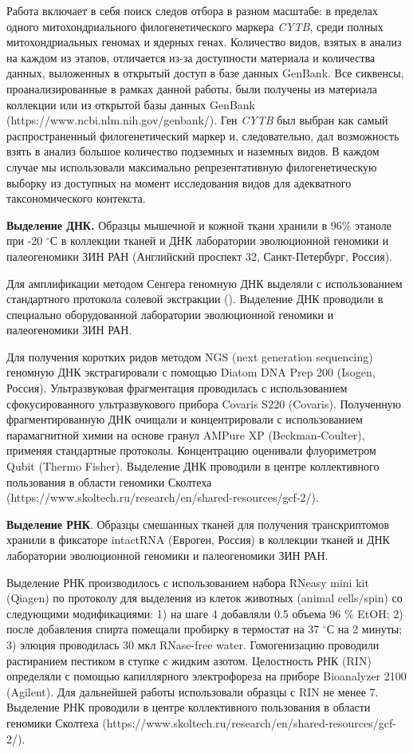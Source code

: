 Работа включает в себя поиск следов отбора в разном масштабе: в пределах одного митохондриального филогенетического маркера \textit{CYTB}, среди полных митохондриальных геномах и ядерных генах. Количество видов, взятых в анализ на каждом из этапов, отличается из-за доступности материала и количества данных, выложенных в открытый доступ в базе данных GenBank. Все сиквенсы, проанализированные в рамках данной работы, были получены из материала коллекции или из открытой базы данных GenBank (https://www.ncbi.nlm.nih.gov/genbank/). Ген \textit{CYTB} был выбран как самый распространенный филогенетический маркер и, следовательно, дал возможность взять в анализ большое количество подземных и наземных видов. В каждом случае мы использовали максимально репрезентативную филогенетическую выборку из доступных на момент исследования видов для адекватного таксономического контекста.

\textbf{Выделение ДНК.} Образцы мышечной и кожной ткани хранили в 96\% этаноле при -20 $^\circ$С в коллекции тканей и ДНК лаборатории эволюционной геномики и палеогеномики ЗИН РАН (Английский проспект 32, Санкт-Петербург, Россия).  

Для амплификации методом Сенгера геномную ДНК выделяли с использованием стандартного протокола солевой экстракции (\cite{Miller1999}). Выделение ДНК проводили в специально оборудованной лаборатории эволюционной геномики и палеогеномики ЗИН РАН.

Для получения коротких ридов методом NGS (next generation sequencing) геномную ДНК экстрагировали с помощью Diatom DNA Prep 200 (Isogen, Россия). Ультразвуковая фрагментация проводилась с использованием сфокусированного ультразвукового прибора Covaris S220 (Covaris). Полученную фрагментированную ДНК очищали и концентрировали с использованием парамагнитной химии на основе гранул AMPure XP (Beckman-Coulter), применяя стандартные протоколы. Концентрацию оценивали флуориметром Qubit (Thermo Fisher). Выделение ДНК проводили в центре коллективного пользования в области геномики Сколтеха (https://www.skoltech.ru/research/en/shared-resources/gcf-2/).

\textbf{Выделение РНК}. Образцы смешанных тканей для получения транскриптомов хранили в фиксаторе intactRNA (Евроген, Россия) в коллекции тканей и ДНК лаборатории эволюционной геномики и палеогеномики ЗИН РАН. 

Выделение РНК производилось с использованием набора RNeasy mini kit (Qiagen) по протоколу для выделения из клеток животных (animal cells/spin) со следующими модификациями: 1) на шаге 4 добавляли 0.5 объема 96 \% EtOH; 2) после добавления спирта помещали пробирку в термостат на 37 $^\circ$С на 2 минуты; 3) элюция проводилась 30 мкл RNase-free water. Гомогенизацию проводили растиранием пестиком в ступке с жидким азотом. Целостность РНК (RIN) определяли с помощью капиллярного электрофореза на приборе Bioanalyzer 2100 (Agilent). Для дальнейшей работы использовали образцы с RIN не менее 7. Выделение РНК проводили в центре коллективного пользования в области геномики Сколтеха (https://www.skoltech.ru/research/en/shared-resources/gcf-2/).


